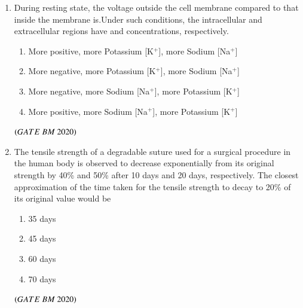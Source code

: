 \documentclass[journal,12pt,onecolumn]{IEEEtran}
\theoremstyle{remark}
\begin{document}
\begin{enumerate}
\item During resting state, the voltage outside the cell membrane compared to that inside the membrane is\underline{\hspace{2cm}}.Under such conditions, the intracellular and extracellular regions have
\underline{\hspace{2cm}} and \underline{\hspace{2cm}} concentrations, respectively.
\begin{enumerate}[label=\alph*)] 
\item\hspace{0.5cm}More positive, more Potassium [K$^+$], more Sodium [Na$^+$]
\item\hspace{0.5cm}More negative, more Potassium [K$^+$], more Sodium [Na$^+$]
\item\hspace{0.5cm}More negative, more Sodium [Na$^+$], more Potassium [K$^+$]
\item\hspace{0.5cm}More positive, more Sodium [Na$^+$], more Potassium [K$^+$]
\end{enumerate}
 \hfill $\brak{GATE\ BM\ 2020}$\\
 
\item The tensile strength of a degradable suture used for a surgical procedure in the
human body is observed to decrease exponentially from its original strength by
40\% and 50\% after 10 days and 20 days, respectively. The closest approximation
of the time taken for the tensile strength to decay to 20\% of its original value
would be
\begin{enumerate}[label=\alph*)] 
\item\hspace{0.5cm}35 days
\item\hspace{0.5cm}45 days
\item\hspace{0.5cm}60 days
\item\hspace{0.5cm}70 days
\end{enumerate}
 \hfill $\brak{GATE\ BM\ 2020}$\\
 

\end{enumerate}
\end{document}
